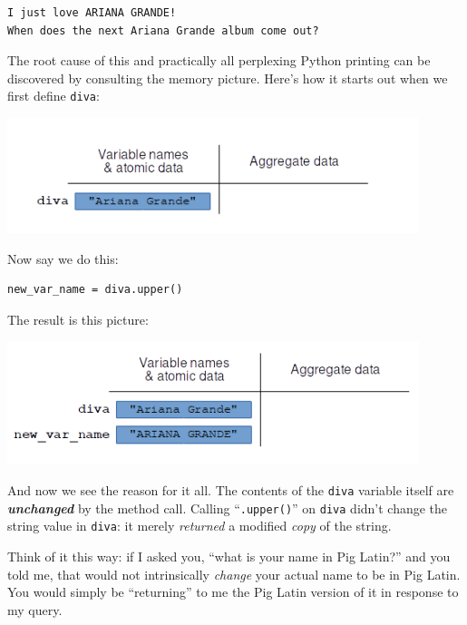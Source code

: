 \begin{Verbatim}[fontsize=\small,samepage=true,frame=leftline,framesep=5mm,framerule=1mm]
I just love ARIANA GRANDE!
When does the next Ariana Grande album come out?
\end{Verbatim}

The root cause of this and practically all perplexing Python printing can be
discovered by consulting the memory picture. Here's how it starts out when we
first define \texttt{diva}:

\vspace{-.2in}
\begin{center}
\includegraphics[width=0.9\textwidth]{bomb.png}
\end{center}

Now say we do this:

\begin{Verbatim}[fontsize=\small,samepage=true,frame=single,framesep=3mm]
new_var_name = diva.upper()
\end{Verbatim}

The result is this picture:

\vspace{-.2in}
\begin{center}
\includegraphics[width=0.9\textwidth]{bomb2.png}
\end{center}

And now we see the reason for it all. The contents of the \texttt{diva}
variable itself are \textit{\textbf{unchanged}} by the method call. Calling
``\texttt{.upper()}'' on \texttt{diva} didn't change the string value in
\texttt{diva}: it merely \textit{returned} a modified \textit{copy} of the
string.

Think of it this way: if I asked you, ``what is your name in Pig Latin?'' and
you told me, that would not intrinsically \textit{change} your actual name to
be in Pig Latin. You would simply be ``returning'' to me the Pig Latin version
of it in response to my query.

